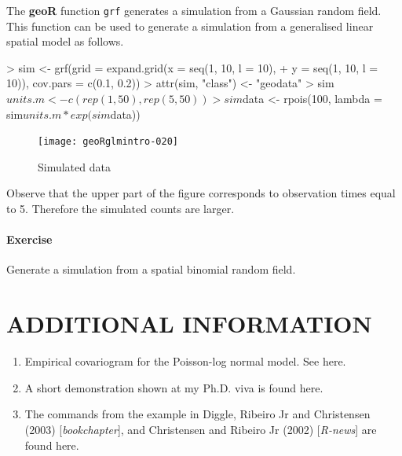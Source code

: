 \documentclass[12pt,a4paper]{article}
\newcommand{\strong}[1]{{\textbf{ #1}}}
\let\pkg=\strong
\newcommand{\code}[1]{\texttt{\small #1}}
\let\command=\code
\begin{document}
The \pkg{geoR} function \command{grf} generates a simulation from a Gaussian random field. This function can be used to generate
a simulation from a generalised linear spatial model as follows.
\begin{Schunk}
\begin{Sinput}
> sim <- grf(grid = expand.grid(x = seq(1, 10, l = 10), 
+     y = seq(1, 10, l = 10)), cov.pars = c(0.1, 0.2))
> attr(sim, "class") <- "geodata"
> sim$units.m <- c(rep(1, 50), rep(5, 50))
> sim$data <- rpois(100, lambda = sim$units.m * exp(sim$data))
\end{Sinput}
\end{Schunk}
\begin{figure}
\centering
\begin{Schunk}
\end{Schunk}
\texttt{[image: geoRglmintro-020]}
\label{fig:simulation}
\caption{Simulated data}
\end{figure}
Observe that the upper part of the figure corresponds to observation times equal to 5.
Therefore the simulated counts are larger.

\paragraph*{Exercise}

Generate a simulation from a spatial binomial random field. 

\section{ADDITIONAL INFORMATION }  

\begin{enumerate}   
\item  Empirical covariogram for the Poisson-log normal model. See here.  
  
\item  A short demonstration shown at my Ph.D. viva is found here. 
  
\item  The commands from the example in Diggle, Ribeiro Jr and Christensen (2003) [{\it bookchapter}], and Christensen and Ribeiro Jr (2002) [{\it R-news}] are found here.  
\end{enumerate}
\end{document}
